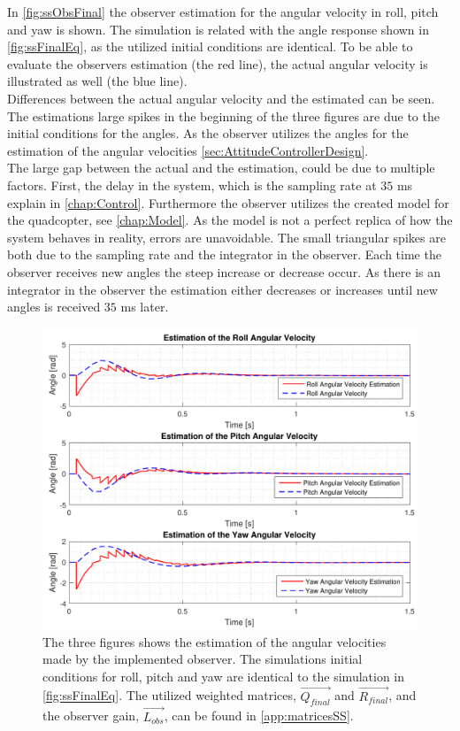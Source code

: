 In \autoref{fig:ssObsFinal} the observer estimation for the angular velocity in roll, pitch and yaw is shown. The simulation is related with the angle response shown in \autoref{fig:ssFinalEq}, as the utilized initial conditions are identical. To be able to evaluate the observers estimation (the red line), the actual angular velocity is illustrated as well (the blue line). \\ Differences between the actual angular velocity and the estimated can be seen. The estimations large spikes in the beginning of the three figures are due to the initial conditions for the angles. As the observer utilizes the angles for the estimation of the angular velocities \autoref{sec:AttitudeControllerDesign}. \\ The large gap between the actual and the estimation, could be due to multiple factors. First, the delay in the system, which is the sampling rate at $35$ \si{ms} explain in \autoref{chap:Control}. Furthermore the observer utilizes the created model for the quadcopter, see \autoref{chap:Model}. As the model is not a perfect replica of how the system behaves in reality, errors are unavoidable. The small triangular spikes are both due to the sampling rate and the integrator in the observer. Each time the observer receives new angles the steep increase or decrease occur. As there is an integrator in the observer the estimation either decreases or increases until new angles is received $35$ \si{ms} later.
%
\begin{figure}[H]
	\centering
	\includegraphics[scale=0.7]{figures/ssObsFinal.pdf}
	\caption{The three figures shows the estimation of the angular velocities made by the implemented observer. The simulations initial conditions for roll, pitch and yaw are identical to the simulation in \autoref{fig:ssFinalEq}. The utilized weighted matrices, $\vec{Q_{final}}$ and $\vec{R_{final}}$, and the observer gain, $\vec{L_{obs}}$, can be found in \autoref{app:matricesSS}.}
	\label{fig:ssObsFinal}
\end{figure}
